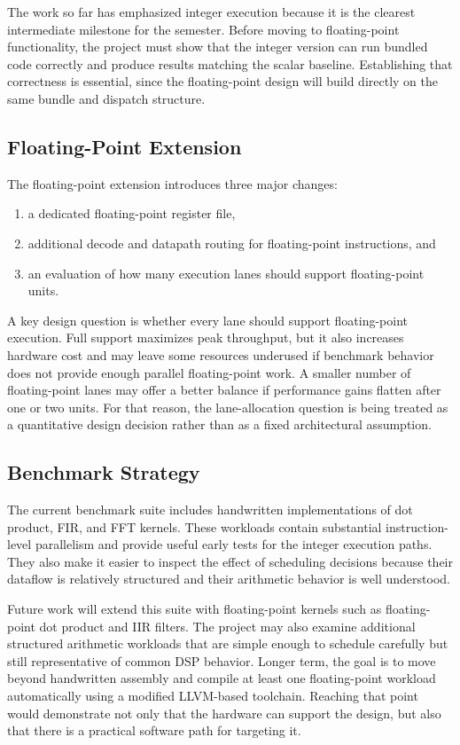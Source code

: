 \documentclass[conference,a4paper]{IEEEtran}
\begin{document}
The work so far has emphasized integer execution because it is the clearest intermediate milestone for the semester. Before moving to floating-point functionality, the project must show that the integer version can run bundled code correctly and produce results matching the scalar baseline. Establishing that correctness is essential, since the floating-point design will build directly on the same bundle and dispatch structure.

\subsection{Floating-Point Extension}

The floating-point extension introduces three major changes:

\begin{enumerate}
    \item a dedicated floating-point register file,
    \item additional decode and datapath routing for floating-point instructions, and
    \item an evaluation of how many execution lanes should support floating-point units.
\end{enumerate}

A key design question is whether every lane should support floating-point execution. Full support maximizes peak throughput, but it also increases hardware cost and may leave some resources underused if benchmark behavior does not provide enough parallel floating-point work. A smaller number of floating-point lanes may offer a better balance if performance gains flatten after one or two units. For that reason, the lane-allocation question is being treated as a quantitative design decision rather than as a fixed architectural assumption.

\subsection{Benchmark Strategy}

The current benchmark suite includes handwritten implementations of dot product, FIR, and FFT kernels. These workloads contain substantial instruction-level parallelism and provide useful early tests for the integer execution paths. They also make it easier to inspect the effect of scheduling decisions because their dataflow is relatively structured and their arithmetic behavior is well understood.

Future work will extend this suite with floating-point kernels such as floating-point dot product and IIR filters. The project may also examine additional structured arithmetic workloads that are simple enough to schedule carefully but still representative of common DSP behavior. Longer term, the goal is to move beyond handwritten assembly and compile at least one floating-point workload automatically using a modified LLVM-based toolchain. Reaching that point would demonstrate not only that the hardware can support the design, but also that there is a practical software path for targeting it.
\end{document}
